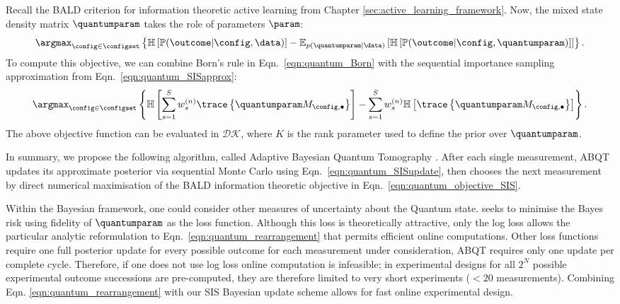 Recall the BALD criterion for information theoretic active learning from Chapter \ref{sec:active_learning_framework}. Now, the mixed state density matrix $\quantumparam$ takes the role of parameters $\param$:
%
\begin{equation}
\argmax_{\config\in\configset} \left\{ \mathbb{H}\left[\mathbb{P}(\outcome|\config,\data)\right] - \mathbb{E}_{p(\quantumparam\vert\data)}\left[\mathbb{H}\left[ \mathbb{P}(\outcome|\config,\quantumparam) \right] \right]\right\}.\label{eqn:quantum_rearrangement}
\end{equation}
%
To compute this objective, we can combine Born's rule in Eqn.\ \eqref{eqn:quantum_Born} with the sequential importance sampling approximation from Eqn.\ \eqref{eqn:quantum_SISapprox}:
%
\begin{equation}
\argmax_{\config\in\configset} \left\{ \mathbb{H}\left[\sum_{s=1}^{S} w^{(n)}_s \trace\left\{\quantumparam M_{\config,\bullet} \right\} \right] - \sum_{s=1}^{S} w^{(n)}_s \mathbb{H}\left[ \trace\left\{\quantumparam M_{\config,\bullet} \right\} \right] \right\}.\label{eqn:quantum_objective_SIS}
\end{equation}
%
The above objective function can be evaluated in $\mathcal{DK}$, where $K$ is the rank parameter used to define the prior over $\quantumparam$.

In summary, we propose the following algorithm, called Adaptive Bayesian Quantum Tomography \citep[ABQT, ][]{Huszar2012quantum}. After each single measurement, ABQT updates its approximate posterior via sequential Monte Carlo using Eqn.\ \eqref{eqn:quantum_SISupdate}, then chooses the next measurement by direct numerical maximisation of the BALD information theoretic objective in Eqn.\ \eqref{eqn:quantum_objective_SIS}.

Within the Bayesian framework, one could consider other measures of uncertainty about the Quantum state. \citep{SelfLearning} seeks to minimise the Bayes risk using fidelity of $\quantumparam$ as the loss function. Although this loss is theoretically attractive, only the log loss allows the particular analytic reformulation to Eqn.\ \eqref{eqn:quantum_rearrangement} that permits efficient online computations. Other loss functions require one full posterior update for every possible outcome for each measurement under consideration, ABQT requires only one update per complete cycle. Therefore, if one does not use log loss online computation is infeasible; in \citep{SelfLearningExperimental} experimental designs for all $2^N$ possible experimental outcome successions are pre-computed, they are therefore limited to very short experiments ($< 20$ measurements). Combining Eqn. \eqref{eqn:quantum_rearrangement} with our SIS Bayesian update scheme allows for fast online experimental design.

